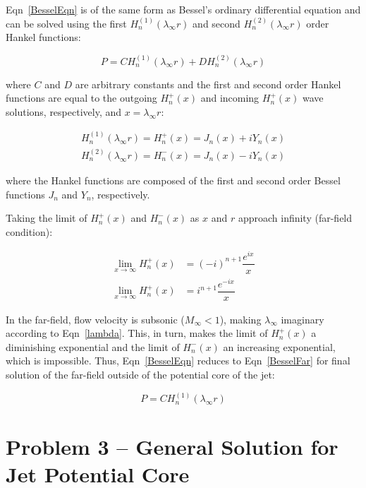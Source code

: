 \documentclass[]{aiaa-tc}%
\begin{document}
Eqn~\ref{BesselEqn} is of the same form as Bessel's ordinary differential equation and can be solved using the first $H_n^{(1)}(\lambda_{\infty} r)$ and second $H_n^{(2)}(\lambda_{\infty} r)$ order Hankel functions:

\begin{equation}
P = C H_n^{(1)}(\lambda_{\infty} r) + D H_n^{(2)}(\lambda_{\infty} r)
\end{equation}

\noindent where $C$ and $D$ are arbitrary constants and the first and second order Hankel functions are equal to the outgoing $H_n^{+}(x)$ and incoming $H_n^{+}(x)$ wave solutions, respectively, and $x = \lambda_{\infty} r$:

\begin{align}
H_n^{(1)}(\lambda_{\infty} r) = H_n^{+}(x) = J_n(x) + i Y_n(x) \\
H_n^{(2)}(\lambda_{\infty} r) = H_n^{-}(x) = J_n(x) - i Y_n(x)
\end{align}

\noindent where the Hankel functions are composed of the first and second order Bessel functions $J_n$ and $Y_n$, respectively.

Taking the limit of $H_n^{+}(x)$ and $H_n^{-}(x)$ as $x$ and $r$ approach infinity (far-field condition):

\begin{align*}
\lim_{x\to\infty} H_n^{+}(x) &= (-i)^{n+1} \dfrac{e^{ix}}{x} \\
\lim_{x\to\infty} H_n^{+}(x) &= i^{n+1}    \dfrac{e^{-ix}}{x}
\end{align*}

In the far-field, flow velocity is subsonic ($M_{\infty}<1$), making $\lambda_{\infty}$ imaginary according to Eqn~\ref{lambda}.  This, in turn, makes the limit of $H_n^{+}(x)$ a diminishing exponential and the limit of $H_n^{-}(x)$ an increasing exponential, which is impossible.  Thus, Eqn~\ref{BesselEqn} reduces to Eqn~\ref{BesselFar} for final solution of the far-field outside of the potential core of the jet:

\begin{equation} \label{BesselFar}
\boxed{P = C H_n^{(1)}(\lambda_{\infty} r)}
\end{equation}








\section{Problem 3 -- General Solution for Jet Potential Core} \label{SecProb3}
\end{document}
